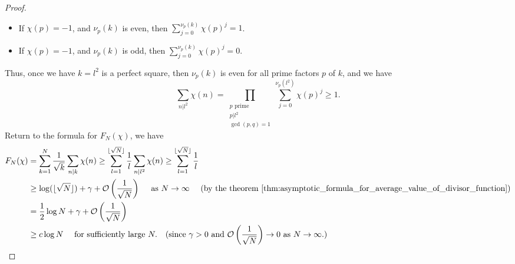 \documentclass{elegantbook}
\begin{document}
\begin{proof}
\begin{itemize}
    \item If $\chi(p) = -1$, and $\nu_p(k)$ is even, then $\sum_{j=0}^{\nu_p(k)} \chi(p)^j = 1$.
    \item If $\chi(p) = -1$, and $\nu_p(k)$ is odd, then $\sum_{j=0}^{\nu_p(k)} \chi(p)^j = 0$.
  \end{itemize}
  Thus, once we have $k=l^2$ is a perfect square, then $\nu_p(k)$ is even for all prime factors \(p\) of \(k\), and we have
  \[
    \sum_{n|l^2}\chi(n) = \prod_{\substack{p\text{ prime} \\ p|l^2 \\ \gcd(p,q)=1}} \sum_{j=0}^{\nu_p(l^2)} \chi(p)^j \geq 1.
  \]
  Return to the formula for \(F_N(\chi)\), we have
  \[
  \begin{aligned}
    F_N(\chi) &= \sum_{k=1}^N \frac{1}{\sqrt{k}}\sum_{n|k}\chi(n) \geq \sum_{l=1}^{\lfloor \sqrt{N} \rfloor} \frac{1}{l} \sum_{n|l^2}\chi(n) \geq \sum_{l=1}^{\lfloor \sqrt{N} \rfloor} \frac{1}{l} \\
    &\geq \log(\lfloor \sqrt{N} \rfloor) + \gamma + \mathcal{O}\left( \frac{1}{\sqrt{N}} \right) \quad \text{ as } N \to \infty \quad \text{ (by the theorem~\ref{thm:asymptotic_formula_for_average_value_of_divisor_function})} \\
    &= \frac{1}{2} \log N + \gamma + \mathcal{O}\left( \frac{1}{\sqrt{N}} \right) \\
    &\geq c \log N \quad \text{ for sufficiently large } N. \quad (\text{since } \gamma > 0 \text{ and } \mathcal{O}\left( \frac{1}{\sqrt{N}} \right) \to 0 \text{ as } N \to \infty.)
  \end{aligned}
  \]


\end{proof}
\end{document}
